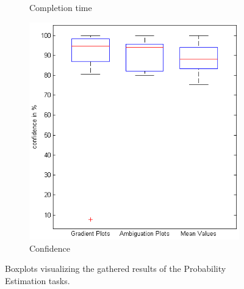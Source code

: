 \begin{figure}[H]
\begin{subfigure}[b]{0.32\textwidth}
        \caption{Completion time}
        \label{fig:s1_time}
    \end{subfigure}
		\begin{subfigure}[b]{0.32\textwidth}
        \includegraphics[width=\textwidth]{figures/boxplots/s1_confidence.png}
        \caption{Confidence}
        \label{fig:s1_confidence}
    \end{subfigure}
    \caption{Boxplots visualizing the gathered results of the Probability Estimation tasks.}
		\label{fig:s1_boxplots}
\end{figure}

